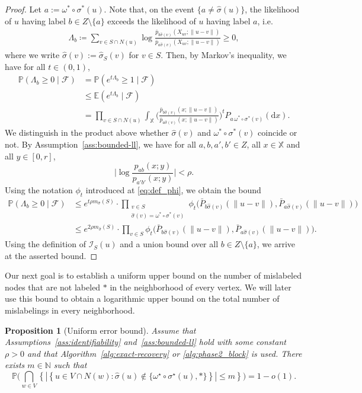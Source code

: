 \documentclass[11pt, a4paper]{amsart}
\renewcommand{\P}{\mathbb{P}}
\newcommand{\1}{\mathbf{1}}
\newtheorem{proposition}[theorem]{Proposition}
\theoremstyle{definition}
\theoremstyle{remark}
\theoremstyle{definition}
\begin{document}
\begin{proof}
      Let $a:=\omega^* \circ \sigma^*(u)$. Note that, on the event $\{a \neq \hat \sigma(u)\}$, the likelihood of $u$ having label $b \in Z \setminus \{a\}$ exceeds the likelihood of $u$ having label $a$, i.e.
    \begin{align*}
        \Lambda_{b} \coloneqq \sum_{v \in S \cap N(u)} \log \frac{\bar p_{b \hat{\sigma}(v)}(X_{uv};\|u-v\|)}{\bar p_{a \hat{\sigma}(v)}(X_{uv};\|u-v\|)} \geq 0,
    \end{align*}
       where we write $\hat \sigma(v):=\hat\sigma_S(v)$ for $v\in S$. Then, by Markov's inequality, we have for all $t \in (0,1)$, 
    \begin{align*}
        \mathbb{P}(\Lambda_{b} \geq 0 \mid \mathcal F) &= \mathbb{P}(e^{t\Lambda_{b}} \geq 1 \mid \mathcal F) \\
        &\leq \mathbb{E}(e^{t\Lambda_{b}} \mid \mathcal F) \\
        &= \prod_{v \in S \cap N(u)} \int_{\mathbb X} \Big(\frac{\bar{p}_{b \hat{\sigma}(v)}(x;\|u-v\|)}{\bar{p}_{a \hat{\sigma}(v)}(x;\|u-v\|)}\Big)^t P_{a \,\omega^* \circ\sigma^*(v)}(\mathrm d x).
    \end{align*} 
    We distinguish in the product above whether $\hat{\sigma}(v)$ and $\omega^* \circ  \sigma^*(v)$ coincide or not. By Assumption~\ref{ass:bounded-ll}, we have for all $a,b,a',b' \in Z$, all $x \in \mathbb X$ and all $y \in [0,r]$,
    $$
          \bigg|\log \frac{{p}_{ab}(x; y)}{{p}_{a'b'}(x; y)}\bigg| < \rho.
    $$
    Using the notation $\phi_t$ introduced at \eqref{eq:def_phi}, we obtain the bound
    \begin{align*}
       \mathbb{P}(\Lambda_{b} \geq 0 \mid \mathcal F) &\leq  e^{t\rho m_{\hat \sigma}(S)} \cdot \prod_{\substack{v \in S \\ \hat{\sigma}(v) = \omega^* \circ \sigma^*(v)}} \phi_t \Big(\bar{P}_{b\hat{\sigma}(v)}(\|u-v\|), \bar{P}_{a\hat{\sigma}(v)}(\|u-v\|)\Big)\\
       &\leq e^{2\rho m_{\hat \sigma}(S)} \cdot \prod_{v \in S} \phi_t \Big(\bar{P}_{b\hat{\sigma}(v)}(\|u-v\|), \bar{P}_{a\hat{\sigma}(v)}(\|u-v\|)\Big).
    \end{align*}
    Using the definition of $\mathcal I_S(u)$ and a union bound over all $b \in Z\setminus \{a\}$, we arrive at the asserted bound.
\end{proof}

Our next goal is to establish a uniform upper bound on the number of mislabeled nodes that are not labeled $*$ in the neighborhood of every vertex. We will later use this bound to obtain a logarithmic upper bound on the total number of mislabelings in every neighborhood.
\begin{proposition}[Uniform error bound]
\label{prop:abs_propagation}
Assume that Assumptions~\ref{ass:identifiability} and~\ref{ass:bounded-ll} hold with some constant
$\rho>0$ and that Algorithm~\ref{alg:exact-recovery} or \ref{alg:phase2_block} is used. There exists $m\in\mathbb N$ such that
\[
\P\Big(
\bigcap_{w\in V}
\left\{
\left|
\left\{
u\in V\cap N(w):
\widehat\sigma(u)
\notin
\{\omega^\star\circ\sigma^\star(u),*\}
\right\}
\right|
\le m
\right\} \Big) = 1-o(1).
\]
\end{proposition}
\end{document}
